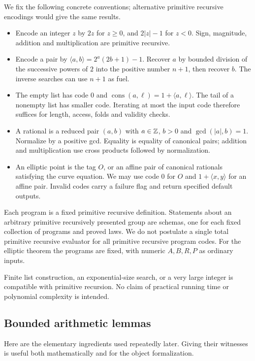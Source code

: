 We fix the following concrete conventions; alternative primitive recursive
encodings would give the same results.

\begin{itemize}
\item Encode an integer $z$ by $2z$ for $z\ge0$, and $2|z|-1$ for $z<0$.
Sign, magnitude, addition and multiplication are primitive recursive.
\item Encode a pair by
$\langle a,b\rangle=2^a(2b+1)-1$. Recover $a$ by bounded division of the
successive powers of $2$ into the positive number $n+1$, then recover $b$.
The inverse searches can use $n+1$ as fuel.
\item The empty list has code $0$ and
$\operatorname{cons}(a,\ell)=1+\langle a,\ell\rangle$.
The tail of a nonempty list has smaller code. Iterating at most the input
code therefore suffices for length, access, folds and validity checks.
\item A rational is a reduced pair $(a,b)$ with $a\in\mathbb Z$, $b>0$ and
$\gcd(|a|,b)=1$. Normalize by a positive gcd. Equality is equality of
canonical pairs; addition and multiplication use cross products followed
by normalization.
\item An elliptic point is the tag $O$, or an affine pair of canonical
rationals satisfying the curve equation. We may use code $0$ for $O$
and $1+\langle x,y\rangle$ for an affine pair. Invalid codes carry a
failure flag and return specified default outputs.
\end{itemize}

Each program is a fixed primitive recursive definition. Statements about
an arbitrary primitive recursively presented group are schemas, one for
each fixed collection of programs and proved laws. We do not postulate a
single total primitive recursive evaluator for all primitive recursive
program codes. For the elliptic theorem the programs are fixed, with
numeric $A,B,R,P$ as ordinary inputs.

Finite list construction, an exponential-size search, or a very large
integer is compatible with primitive recursion. No claim of practical
running time or polynomial complexity is intended.

\subsection{Bounded arithmetic lemmas}
\label{subsec:gcd}

Here are the elementary ingredients used repeatedly later. Giving their
witnesses is useful both mathematically and for the object formalization.

